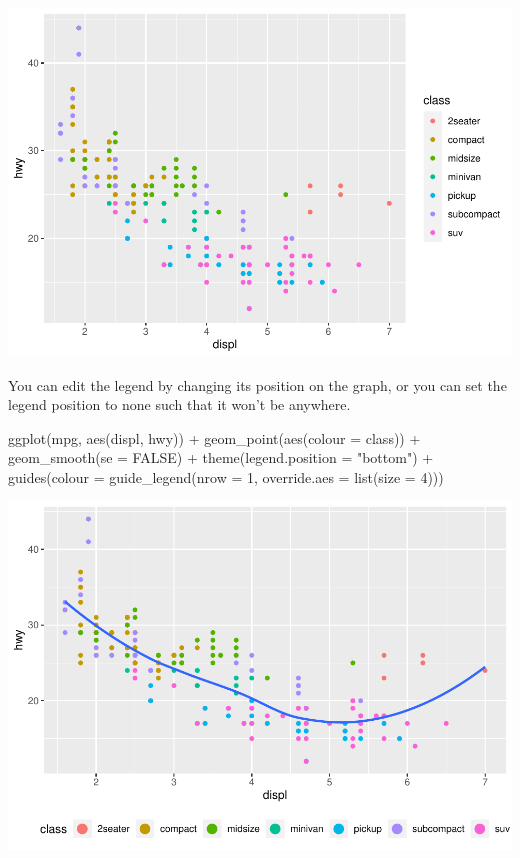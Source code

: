 \documentclass[
]{article}
\newenvironment{Shaded}{\begin{snugshade}}{\end{snugshade}}
\newcommand{\AttributeTok}[1]{\textcolor[rgb]{0.77,0.63,0.00}{#1}}
\newcommand{\ConstantTok}[1]{\textcolor[rgb]{0.00,0.00,0.00}{#1}}
\newcommand{\DecValTok}[1]{\textcolor[rgb]{0.00,0.00,0.81}{#1}}
\newcommand{\FunctionTok}[1]{\textcolor[rgb]{0.00,0.00,0.00}{#1}}
\newcommand{\NormalTok}[1]{#1}
\newcommand{\SpecialCharTok}[1]{\textcolor[rgb]{0.00,0.00,0.00}{#1}}
\newcommand{\StringTok}[1]{\textcolor[rgb]{0.31,0.60,0.02}{#1}}
\begin{document}
\includegraphics{Journal_files/figure-latex/unnamed-chunk-62-4.pdf}

You can edit the legend by changing its position on the graph, or you
can set the legend position to none such that it won't be anywhere.

\begin{Shaded}
\begin{Highlighting}[]
\FunctionTok{ggplot}\NormalTok{(mpg, }\FunctionTok{aes}\NormalTok{(displ, hwy)) }\SpecialCharTok{+}
  \FunctionTok{geom\_point}\NormalTok{(}\FunctionTok{aes}\NormalTok{(}\AttributeTok{colour =}\NormalTok{ class)) }\SpecialCharTok{+}
  \FunctionTok{geom\_smooth}\NormalTok{(}\AttributeTok{se =} \ConstantTok{FALSE}\NormalTok{) }\SpecialCharTok{+}
  \FunctionTok{theme}\NormalTok{(}\AttributeTok{legend.position =} \StringTok{"bottom"}\NormalTok{) }\SpecialCharTok{+}
  \FunctionTok{guides}\NormalTok{(}\AttributeTok{colour =} \FunctionTok{guide\_legend}\NormalTok{(}\AttributeTok{nrow =} \DecValTok{1}\NormalTok{, }\AttributeTok{override.aes =} \FunctionTok{list}\NormalTok{(}\AttributeTok{size =} \DecValTok{4}\NormalTok{)))}
\end{Highlighting}
\end{Shaded}

\includegraphics{Journal_files/figure-latex/unnamed-chunk-63-1.pdf}
\end{document}
